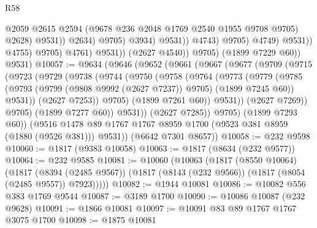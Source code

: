 \begin{lexlean}{R58}
\begin{coremodule}
                                                @2059
                                                @2615
                                                @2594
                                                (@9678 @236 @2048 @1769 @2540 @1955 @9708 @9705)
                                                @2628)
                                              @9531))
                                          @2634)
                                        @9705)
                                      @3934)
                                    @9531))
                                @4743)
                              @9705)
                            @4749)
                          @9531))
                      @4755)
                    @9705)
                  @4761)
                @9531))
            (@2627 @4540))
          @9705)
        (@1899 @7229 @60))
      @9531)
@10057 := @9634
    (@9646
      (@9652
        (@9661
          (@9667
            (@9677
              (@9709
                (@9715
                  (@9723
                    (@9729
                      (@9738
                        (@9744
                          (@9750
                            (@9758
                              (@9764
                                (@9773
                                  (@9779
                                    (@9785
                                      (@9793
                                        (@9799 (@9808 @9992 (@2627 @7237)) @9705)
                                        (@1899 @7245 @60))
                                      @9531))
                                  (@2627 @7253))
                                @9705)
                              (@1899 @7261 @60))
                            @9531))
                        (@2627 @7269))
                      @9705)
                    (@1899 @7277 @60))
                  @9531))
              (@2627 @7285))
            @9705)
          (@1899 @7293 @60))
        (@9516 @1478 @89 @1767 @1767 @8959 @1700 (@9523 @381 @8959 (@1880 (@9526 @381))) @9531))
      (@6642 @7301 @8657))
@10058 := @232 @9598
@10060 := @1817 (@9383 @10058)
@10063 := @1817 (@8634 (@232 @9577))
@10064 := @232 @9585
@10081 := @10060
    (@10063
      (@1817
        (@8550 @10064)
        (@1817
          (@8394 (@2485 @9567))
          (@1817 (@8143 (@232 @9566)) (@1817 (@8054 (@2485 @9557)) @7923)))))
@10082 := @1944 @10081
@10086 := @10082 @556 @383 @1769 @9544
@10087 := @3189 @1700
@10090 := @10086 @10087 (@232 @9628)
@10091 := @1866 @10081
@10097 := @10091 @83 @89 @1767 @1767 @3075 @1700
@10098 := @1875 @10081

\end{coremodule}
\end{lexlean}
